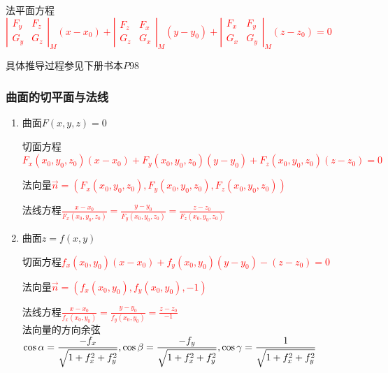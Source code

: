 \documentclass{article} %
\begin{document}
\begin{enumerate}
        法平面方程\textcolor{red}{
            $\displaystyle
            \left|\begin{array}{cc}F_y&F_z\\G_y&G_z\end{array}\right|_M(x-x_0)+
            \left|\begin{array}{cc}F_z&F_x\\G_z&G_x\end{array}\right|_M(y-y_0)+
            \left|\begin{array}{cc}F_x&F_y\\G_x&G_y\end{array}\right|_M(z-z_0)=0$}\par
        具体推导过程参见下册书本$P98$
\end{enumerate}

\subsubsection{曲面的切平面与法线}
\begin{enumerate}
    \item 曲面$F(x,y,z)=0$\par
        切面方程\textcolor{red}{$F_x(x_0,y_0,z_0)(x-x_0)+F_y(x_0,y_0,z_0)(y-y_0)+F_z(x_0,y_0,z_0)(z-z_0)=0$}\vspace{2mm}\par
        法向量\textcolor{red}{$\vec{n}=(F_x(x_0,y_0,z_0),F_y(x_0,y_0,z_0),F_z(x_0,y_0,z_0))$}\vspace{2mm}\par
        法线方程\textcolor{red}{$\displaystyle
            \frac{x-x_0}{F_x(x_0,y_0,z_0)}=
            \frac{y-y_0}{F_y(x_0,y_0,z_0)}=
            \frac{z-z_0}{F_z(x_0,y_0,z_0)}
            $}
    \item 曲面$z=f(x,y)$\par
        切面方程\textcolor{red}{$f_x(x_0,y_0)(x-x_0)+f_y(x_0,y_0)(y-y_0)-(z-z_0)=0$}\vspace{2mm}\par
        法向量\textcolor{red}{$\vec{n}=(f_x(x_0,y_0),f_y(x_0,y_0),-1)$}\vspace{2mm}\par
        法线方程\textcolor{red}{$\displaystyle
            \frac{x-x_0}{f_x(x_0,y_0)}=
            \frac{y-y_0}{f_y(x_0,y_0)}=
            \frac{z-z_0}{-1}
        $}\\
        法向量的方向余弦\textcolor{red}{$\displaystyle
            \cos\alpha={-f_x\over\sqrt{1+f_x^2+f_y^2}},
            \cos\beta={-f_y\over\sqrt{1+f_x^2+f_y^2}},
            \cos\gamma={1\over\sqrt{1+f_x^2+f_y^2}}$}
\end{enumerate}
\end{document}

